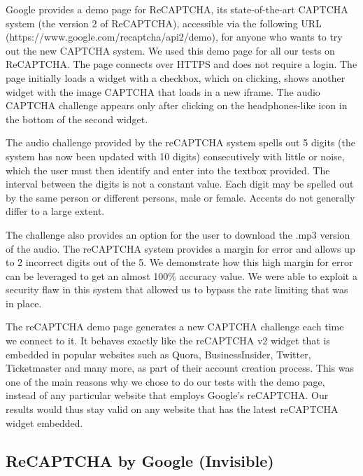 Google provides a demo page for ReCAPTCHA, its state-of-the-art CAPTCHA system (the version 2 of ReCAPTCHA), accessible via the following URL (https://www.google.com/\newline recaptcha/api2/demo), for anyone who wants to try out the new CAPTCHA system. We used this demo page for all our tests on ReCAPTCHA. The page connects over HTTPS and does not require a login. The page initially loads a widget with a checkbox, which on clicking, shows another widget with the image CAPTCHA that loads in a new iframe. The audio CAPTCHA challenge appears only after clicking on the headphones-like icon in the bottom of the second widget.\newline

The audio challenge provided by the reCAPTCHA system spells out 5 digits  (the system has now been updated with 10 digits) consecutively with little or noise, which the user must then identify and enter into the textbox provided. The interval between the digits is not a constant value. Each digit may be spelled out by the same person or different persons, male or female. Accents do not generally differ to a large extent.\newline

The challenge also provides an option for the user to download the .mp3 version of the audio. The reCAPTCHA system provides a margin for error and allows up to 2 incorrect digits out of the 5. We demonstrate how this high margin for error can be leveraged to get an almost 100\% accuracy value. We were able to exploit a security flaw in this system that allowed us to bypass the rate limiting that was in place.\newline

The reCAPTCHA demo page generates a new CAPTCHA challenge each time we connect to it. It behaves exactly like the reCAPTCHA v2 widget that is embedded in popular websites such as Quora, BusinessInsider, Twitter, Ticketmaster and many more, as part of their account creation process. This was one of the main reasons why we chose to do our tests with the demo page, instead of any particular website that employs Google's reCAPTCHA. Our results would thus stay valid on any website that has the latest reCAPTCHA widget embedded.\newline

\subsection{ReCAPTCHA by Google (Invisible)} \mbox{} \

